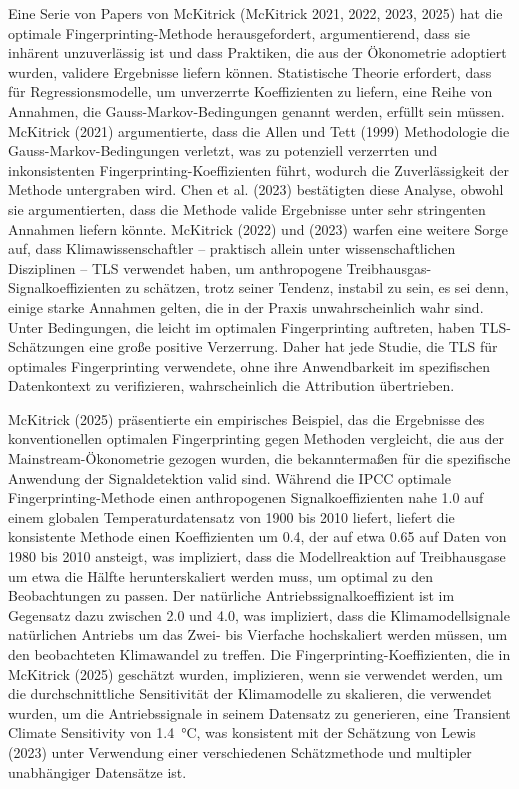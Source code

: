 \documentclass[12pt,paper=a4,DIV=12,parskip=never,chapterprefix=false,headings=standardclasses]{scrreprt}
\begin{document}
Eine Serie von Papers von McKitrick (McKitrick 2021, 2022, 2023, 2025) hat die optimale Fingerprinting-Methode herausgefordert, argumentierend, dass sie inhärent unzuverlässig ist und dass Praktiken, die aus der Ökonometrie adoptiert wurden, validere Ergebnisse liefern können. Statistische Theorie erfordert, dass für Regressionsmodelle, um unverzerrte Koeffizienten zu liefern, eine Reihe von Annahmen, die Gauss-Markov-Bedingungen genannt werden, erfüllt sein müssen. McKitrick (2021) argumentierte, dass die Allen und Tett (1999) Methodologie die Gauss-Markov-Bedingungen verletzt, was zu potenziell verzerrten und inkonsistenten Fingerprinting-Koeffizienten führt, wodurch die Zuverlässigkeit der Methode untergraben wird. Chen et al. (2023) bestätigten diese Analyse, obwohl sie argumentierten, dass die Methode valide Ergebnisse unter sehr stringenten Annahmen liefern könnte. McKitrick (2022) und (2023) warfen eine weitere Sorge auf, dass Klimawissenschaftler – praktisch allein unter wissenschaftlichen Disziplinen – TLS verwendet haben, um anthropogene Treibhausgas-Signalkoeffizienten zu schätzen, trotz seiner Tendenz, instabil zu sein, es sei denn, einige starke Annahmen gelten, die in der Praxis unwahrscheinlich wahr sind.
Unter Bedingungen, die leicht im optimalen Fingerprinting auftreten, haben TLS-Schätzungen eine große positive Verzerrung. Daher hat jede Studie, die TLS für optimales Fingerprinting verwendete, ohne ihre Anwendbarkeit im spezifischen Datenkontext zu verifizieren, wahrscheinlich die Attribution übertrieben.

McKitrick (2025) präsentierte ein empirisches Beispiel, das die Ergebnisse des konventionellen optimalen Fingerprinting gegen Methoden vergleicht, die aus der Mainstream-Ökonometrie gezogen wurden, die bekanntermaßen für die spezifische Anwendung der Signaldetektion valid sind. Während die IPCC optimale Fingerprinting-Methode einen anthropogenen Signalkoeffizienten nahe 1.0 auf einem globalen Temperaturdatensatz von 1900 bis 2010 liefert, liefert die konsistente Methode einen Koeffizienten um 0.4, der auf etwa 0.65 auf Daten von 1980 bis 2010 ansteigt, was impliziert, dass die Modellreaktion auf Treibhausgase um etwa die Hälfte herunterskaliert werden muss, um optimal zu den Beobachtungen zu passen. Der natürliche Antriebssignalkoeffizient ist im Gegensatz dazu zwischen 2.0 und 4.0, was impliziert, dass die Klimamodellsignale natürlichen Antriebs um das Zwei- bis Vierfache hochskaliert werden müssen, um den beobachteten Klimawandel zu treffen.
Die Fingerprinting-Koeffizienten, die in McKitrick (2025) geschätzt wurden, implizieren, wenn sie verwendet werden, um die durchschnittliche Sensitivität der Klimamodelle zu skalieren, die verwendet wurden, um die Antriebssignale in seinem Datensatz zu generieren, eine Transient Climate Sensitivity von \SI{1.4}{\celsius}, was konsistent mit der Schätzung von Lewis (2023) unter Verwendung einer verschiedenen Schätzmethode und multipler unabhängiger Datensätze ist.
\end{document}
